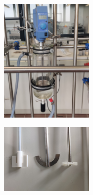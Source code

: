 \documentclass[a4paper, 11pt, draft=false]{scrartcl}
\begin{document}
	\begin{figure}[h!]
		\begin{subfigure}[c]{0.5\textwidth}
			\centering
			\includegraphics[width=0.5\textwidth, angle=-90]{img/Reaktor}
			\captionsetup{labelformat=empty}
		\end{subfigure}
		\begin{subfigure}[c]{0.5\textwidth}
			\centering
			\includegraphics[width=0.5\textwidth]{img/Ankerruehrer}
			\captionsetup{labelformat=empty}
		\end{subfigure}
	\end{figure}
	\FloatBarrier
	
\end{document}
